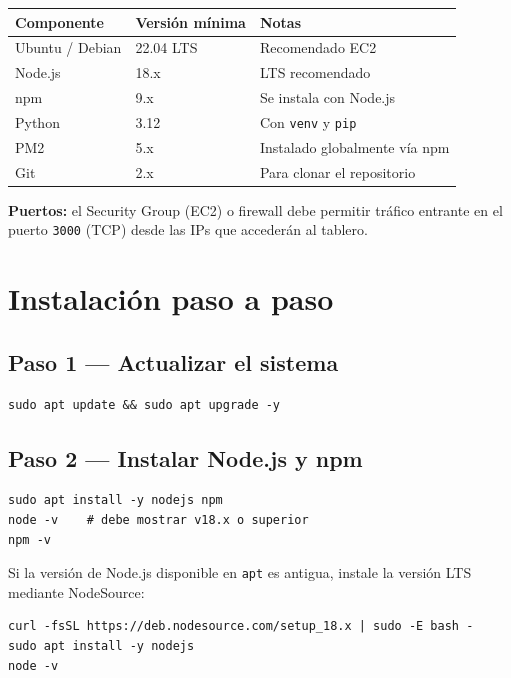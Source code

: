 \documentclass[11pt]{article}
\begin{document}
\begin{center}
\begin{tabular}{lll}
\toprule
\textbf{Componente} & \textbf{Versión mínima} & \textbf{Notas} \\
\midrule
Ubuntu / Debian  & 22.04 LTS & Recomendado EC2 \\
Node.js          & 18.x      & LTS recomendado \\
npm              & 9.x       & Se instala con Node.js \\
Python           & 3.12      & Con \texttt{venv} y \texttt{pip} \\
PM2              & 5.x       & Instalado globalmente vía npm \\
Git              & 2.x       & Para clonar el repositorio \\
\bottomrule
\end{tabular}
\end{center}

\noindent\textbf{Puertos:} el Security Group (EC2) o firewall debe permitir
tráfico entrante en el puerto \texttt{3000} (TCP) desde las IPs que accederán
al tablero.

\section{Instalación paso a paso}

\subsection{Paso 1 — Actualizar el sistema}

\begin{lstlisting}
sudo apt update && sudo apt upgrade -y
\end{lstlisting}

\subsection{Paso 2 — Instalar Node.js y npm}

\begin{lstlisting}
sudo apt install -y nodejs npm
node -v    # debe mostrar v18.x o superior
npm -v
\end{lstlisting}

Si la versión de Node.js disponible en \texttt{apt} es antigua, instale la
versión LTS mediante NodeSource:

\begin{lstlisting}
curl -fsSL https://deb.nodesource.com/setup_18.x | sudo -E bash -
sudo apt install -y nodejs
node -v
\end{lstlisting}
\end{document}
